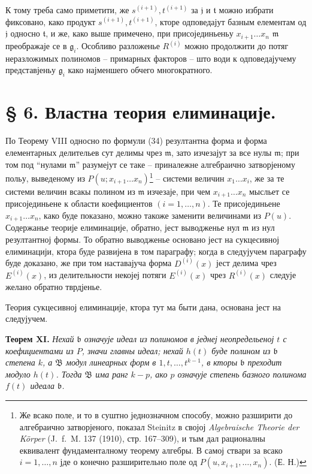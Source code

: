 \documentclass[11pt]{article}
\providecommand{\Bmod}{\mathfrak B}
\providecommand{\mideal}{\mathfrak m}
\providecommand{\gideal}{\mathfrak g}
\providecommand{\jideal}{\mathfrak j}
\providecommand{\tideal}{\mathfrak t}
\providecommand{\bideal}{\mathfrak b}
\begin{document}
К тому треба само приметити, же $s^{(i+1)},t^{(i+1)}$ за $\jideal$ и $\tideal$ можно избрати фиксовано, како продукт $s^{(i+1)},t^{(i+1)}$, кторе одповедајут базным елементам од $\jideal$ односно $\tideal$, и же, како выше примечено, при присојединьеньу $x_{i+1}\ldots x_n$ $\mideal$ преображаје се в $\gideal_i$. Особливо разложенье $R^{(i)}$ можно продолжити до потяг неразложимых полиномов -- примарных факторов -- што води к одповедајучему представјеньу $\gideal_i$ како најменшего обчего многократного.

\clearpage
\section*{§ 6. Властна теория елиминације.}

По Теорему VIII односно по формули (34) резултантна форма и форма елементарных делительев сут делимы чрез $\mideal$, зато изчезајут за все нулы $\mideal$; при том под ``нулами $\mideal$'' разумејут се таке -- приналежне алгебраично затворјеному польу, выведеному из $P(u;x_{i+1}\ldots x_n)$\footnote{Же всако поле, и то в суштно једнозначном способу, можно разширити до алгебраично затворјеного, показал \mbox{Steinitz} в својој \emph{Algebraische Theorie der Körper} (\mbox{J. f. M.} 137 (1910), стр. 167--309), и тым дал рационалны еквивалент фундаменталному теорему алгебры. В самој ствари за всако $i=1,\ldots,n$ јде о конечно разширительно поле од $P(u,x_{i+1},\ldots,x_n)$. (Е. Н.)} -- системи величин $x_1\ldots x_i$, же за те системи величин всакы полином из $\mideal$ изчезаје, при чем $x_{i+1}\ldots x_n$ мысльет се присојединьене к области коефициентов $(i=1,\ldots,n)$. Те присојединьене $x_{i+1}\ldots x_n$, како буде показано, можно такоже заменити величинами из $P(u)$. Содержанье теорије елиминације, обратно, јест выводженье нул $\mideal$ из нул резултантној формы. То обратно выводженье основано јест на сукцесивној елиминацији, ктора буде развијена в том параграфу; когда в следујучем параграфу буде доказано, же при том наставајуча форма $D^{(i)}(x)$ јест делима чрез $E^{(i)}(x)$, из делительности некојеј потяги $E^{(i)}(x)$ чрез $R^{(i)}(x)$ следује желано обратно тврдјенье.

Теория сукцесивној елиминације, ктора тут ма быти дана, основана јест на следујучем.

\medskip
\noindent\textbf{Теорем XI.} {\itshape Нехай $\bideal$ означује идеал из полиномов в једнеј неопредельеној $t$ с коефициентами из $P$, значи главны идеал; нехай $h(t)$ буде полином из $\bideal$ степена $k$, а $\Bmod$ модул линеарных форм в $1,t,\ldots,t^{k-1}$, в кторы $\bideal$ преходит модуло $h(t)$. Тогда $\Bmod$ има ранг $k-p$, ако $p$ означује степень базного полинома $f(t)$ идеала $\bideal$.}
\end{document}

